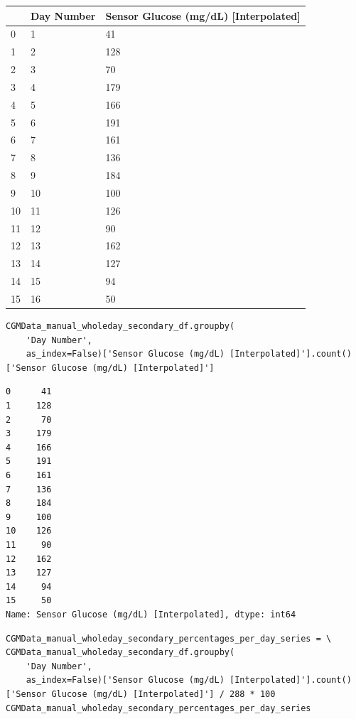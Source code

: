 \bigskip\noindent
\begin{tabular}{p{}p{}p{}}
\toprule
 & Day Number & Sensor Glucose (mg/dL) [Interpolated] \\
\hline
0 & 1 & 41 \\
\hline
1 & 2 & 128 \\
\hline
2 & 3 & 70 \\
\hline
3 & 4 & 179 \\
\hline
4 & 5 & 166 \\
\hline
5 & 6 & 191 \\
\hline
6 & 7 & 161 \\
\hline
7 & 8 & 136 \\
\hline
8 & 9 & 184 \\
\hline
9 & 10 & 100 \\
\hline
10 & 11 & 126 \\
\hline
11 & 12 & 90 \\
\hline
12 & 13 & 162 \\
\hline
13 & 14 & 127 \\
\hline
14 & 15 & 94 \\
\hline
15 & 16 & 50 \\
\hline
\bottomrule
\end{tabular}

\bigskip

\begin{verbatim}
CGMData_manual_wholeday_secondary_df.groupby(
    'Day Number', 
    as_index=False)['Sensor Glucose (mg/dL) [Interpolated]'].count()['Sensor Glucose (mg/dL) [Interpolated]']
\end{verbatim}

\begin{verbatim}
0      41
1     128
2      70
3     179
4     166
5     191
6     161
7     136
8     184
9     100
10    126
11     90
12    162
13    127
14     94
15     50
Name: Sensor Glucose (mg/dL) [Interpolated], dtype: int64
\end{verbatim}

\begin{verbatim}
CGMData_manual_wholeday_secondary_percentages_per_day_series = \
CGMData_manual_wholeday_secondary_df.groupby(
    'Day Number', 
    as_index=False)['Sensor Glucose (mg/dL) [Interpolated]'].count()['Sensor Glucose (mg/dL) [Interpolated]'] / 288 * 100
CGMData_manual_wholeday_secondary_percentages_per_day_series
\end{verbatim}

